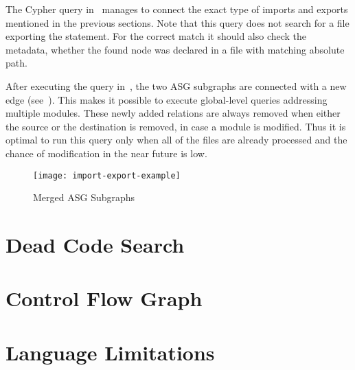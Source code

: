 The Cypher query in~ manages to connect the exact type of imports and exports mentioned in the previous sections. Note that this query does not search for a file exporting the statement. For the correct match it should also check the metadata, whether the found node was declared in a file with matching absolute path.

\begin{figure}[!htb]
	\begin{minipage}{\textwidth}
		
	\end{minipage}
\end{figure}

After executing the query in~, the two ASG subgraphs are connected with a new edge (see~). This makes it possible to execute global-level queries addressing multiple modules. These newly added relations are always removed when either the source or the destination is removed, in case a module is modified. Thus it is optimal to run this query only when all of the files are already processed and the chance of modification in the near future is low.

\begin{sidewaysfigure}[htbp]
  \centering
  \texttt{[image: import-export-example]}
  \caption{Merged ASG Subgraphs}
  \label{fig:import-export-example}
\end{sidewaysfigure}


\section{Dead Code Search}

\section{Control Flow Graph}

\section{Language Limitations}
